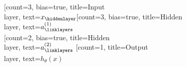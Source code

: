 \documentclass{article}
\begin{document}
\begin{neuralnetwork}[height=4]
  \newcommand{\x}[2]{$x_#2$}
  \newcommand{\hfirst}[2]{\small $a^{(1)}_#2$}
  \newcommand{\hsecond}[2]{\small $a^{(2)}_#2$}
  \newcommand{\y}[2]{$h_{\theta}(x)$}
  [count=3, bias=true, title=Input\\layer, text=\x]
  \hiddenlayer[count=3, bias=true, title=Hidden\\layer, text=\hfirst] \linklayers\\
  \hiddenlayer[count=2, bias=true, title=Hidden\\layer, text=\hsecond] \linklayers
  \outputlayer[count=1, title=Output\\layer, text=\y] \linklayers
\end{neuralnetwork}
\end{document}
